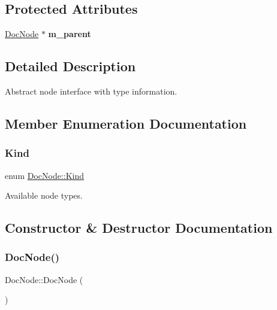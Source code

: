 \subsection*{Protected Attributes}
\begin{DoxyCompactItemize}
\item 
\mbox{\label{class_doc_node_a5f1139016d8919795a0e1c722d3e4b91}} 
\mbox{\hyperlink{class_doc_node}{Doc\+Node}} $\ast$ {\bfseries m\+\_\+parent}
\end{DoxyCompactItemize}


\subsection{Detailed Description}
Abstract node interface with type information. 

\subsection{Member Enumeration Documentation}
\mbox{\label{class_doc_node_aebd16e89ca590d84cbd40543ea5faadb}} 
\subsubsection{\texorpdfstring{Kind}{Kind}}
{\footnotesize\ttfamily enum \mbox{\hyperlink{class_doc_node_aebd16e89ca590d84cbd40543ea5faadb}{Doc\+Node\+::\+Kind}}}

Available node types. 

\subsection{Constructor \& Destructor Documentation}
\mbox{\label{class_doc_node_a98d902adedf9b2270a6673e59dbab89e}} 
\subsubsection{\texorpdfstring{DocNode()}{DocNode()}}
{\footnotesize\ttfamily Doc\+Node\+::\+Doc\+Node (\begin{DoxyParamCaption}{ }\end{DoxyParamCaption})\hspace{0.3cm}{\ttfamily [inline]}}

